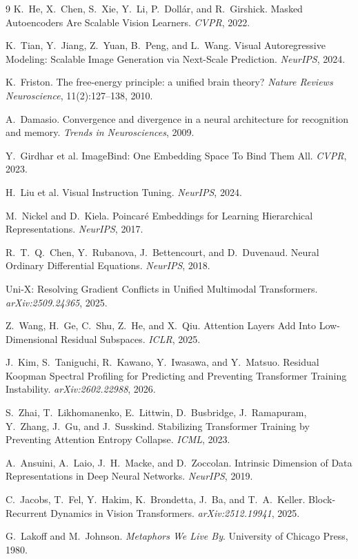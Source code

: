 \documentclass[11pt, a4paper]{article}
\theoremstyle{remark}
\begin{document}
\begin{thebibliography}{9}
K.~He, X.~Chen, S.~Xie, Y.~Li, P.~Doll\'{a}r, and R.~Girshick.
\newblock Masked Autoencoders Are Scalable Vision Learners.
\newblock \emph{CVPR}, 2022.

K.~Tian, Y.~Jiang, Z.~Yuan, B.~Peng, and L.~Wang.
\newblock Visual Autoregressive Modeling: Scalable Image Generation via Next-Scale Prediction.
\newblock \emph{NeurIPS}, 2024.

K.~Friston.
\newblock The free-energy principle: a unified brain theory?
\newblock \emph{Nature Reviews Neuroscience}, 11(2):127--138, 2010.

A.~Damasio.
\newblock Convergence and divergence in a neural architecture for recognition and memory.
\newblock \emph{Trends in Neurosciences}, 2009.

Y.~Girdhar et al.
\newblock ImageBind: One Embedding Space To Bind Them All.
\newblock \emph{CVPR}, 2023.

H.~Liu et al.
\newblock Visual Instruction Tuning.
\newblock \emph{NeurIPS}, 2024.

M.~Nickel and D.~Kiela.
\newblock Poincar\'{e} Embeddings for Learning Hierarchical Representations.
\newblock \emph{NeurIPS}, 2017.

R.~T.~Q.~Chen, Y.~Rubanova, J.~Bettencourt, and D.~Duvenaud.
\newblock Neural Ordinary Differential Equations.
\newblock \emph{NeurIPS}, 2018.

Uni-X: Resolving Gradient Conflicts in Unified Multimodal Transformers.
\newblock \emph{arXiv:2509.24365}, 2025.

Z.~Wang, H.~Ge, C.~Shu, Z.~He, and X.~Qiu.
\newblock Attention Layers Add Into Low-Dimensional Residual Subspaces.
\newblock \emph{ICLR}, 2025.

J.~Kim, S.~Taniguchi, R.~Kawano, Y.~Iwasawa, and Y.~Matsuo.
\newblock Residual Koopman Spectral Profiling for Predicting and Preventing Transformer Training Instability.
\newblock \emph{arXiv:2602.22988}, 2026.

S.~Zhai, T.~Likhomanenko, E.~Littwin, D.~Busbridge, J.~Ramapuram, Y.~Zhang, J.~Gu, and J.~Susskind.
\newblock Stabilizing Transformer Training by Preventing Attention Entropy Collapse.
\newblock \emph{ICML}, 2023.

A.~Ansuini, A.~Laio, J.~H.~Macke, and D.~Zoccolan.
\newblock Intrinsic Dimension of Data Representations in Deep Neural Networks.
\newblock \emph{NeurIPS}, 2019.

C.~Jacobs, T.~Fel, Y.~Hakim, K.~Brondetta, J.~Ba, and T.~A.~Keller.
\newblock Block-Recurrent Dynamics in Vision Transformers.
\newblock \emph{arXiv:2512.19941}, 2025.

G.~Lakoff and M.~Johnson.
\newblock \emph{Metaphors We Live By}.
\newblock University of Chicago Press, 1980.

\end{thebibliography}
\end{document}
